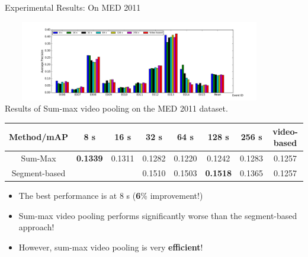 \documentclass{beamer}
\begin{document}
\begin{frame}[t]{Experimental Results: On MED 2011}
\begin{center}
	\includegraphics[width=12cm,height=3.5cm]{images/part3/med11_summax_kernel2.png}
	\\	\scriptsize{Results of Sum-max video pooling on the MED 2011 dataset.}

\begin{table}[h]
	\tiny
	\begin{tabular}{@{}|c|c|c|c|c|c|c|c|@{}}
		\toprule
		Method/mAP                                                                   & 8 s       & 16 s      & 32 s   & 64 s   & 128 s  & 256 s  & video-based \\ \midrule
		Sum-Max                                                                      & \textbf{0.1339}    & 0.1311   & 0.1282 & 0.1220 & 0.1242 & 0.1283 & 0.1257      \\ \midrule
		Segment-based                                                                & \multicolumn{2}{c|}{} & 0.1510 & 0.1503 & \textbf{0.1518} & 0.1365 & 0.1257      \\ \bottomrule
	\end{tabular}
\end{table}
	
\end{center}
\begin{itemize}
	\item The best performance is at 8 s (\textbf{6}\% improvement!)
	\item Sum-max video pooling performs significantly worse than the segment-based approach!
	\item However, sum-max video pooling is very \textbf{efficient}!
\end{itemize}

\end{frame}
\end{document}
